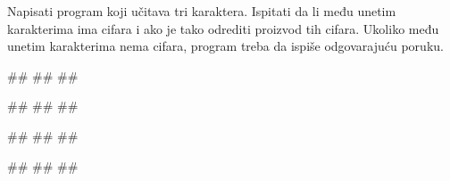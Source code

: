 \begin{Exercise}[label=KT_NG_10] 
Napisati program koji učitava tri karaktera. Ispitati da li među unetim karakterima ima cifara i ako je tako
odrediti proizvod tih cifara. 
Ukoliko među unetim karakterima nema cifara, program treba da ispiše odgovarajuću poruku.

\begin{miditest}
\begin{upotreba}{1}
#\naslovInt#
##
##
\end{upotreba}
\end{miditest}
\begin{miditest}
\begin{upotreba}{2}
#\naslovInt#
##
##
\end{upotreba}
\end{miditest}

\begin{miditest}
\begin{upotreba}{3}
#\naslovInt#
##
##
\end{upotreba}
\end{miditest}
\begin{miditest}
\begin{upotreba}{4}
#\naslovInt#
##
##
\end{upotreba}
\end{miditest}

\end{Exercise}
\ifresenja
 \begin{Answer}[ref=KT_NG_10]
\end{Answer}
\fi


